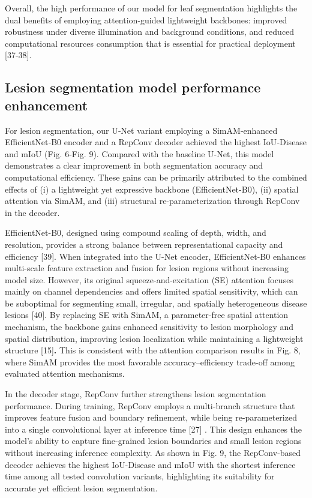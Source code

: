 \documentclass[
]{article}
\begin{document}
Overall, the high performance of our model for leaf segmentation
highlights the dual benefits of employing attention-guided lightweight
backbones: improved robustness under diverse illumination and background
conditions, and reduced computational resources consumption that is
essential for practical deployment {[}37-38{]}.

\hypertarget{lesion-segmentation-model-performance-enhancement}{%
\subsection{Lesion segmentation model performance
enhancement}\label{lesion-segmentation-model-performance-enhancement}}

For lesion segmentation, our U‑Net variant employing a SimAM‑enhanced
EfficientNet‑B0 encoder and a RepConv decoder achieved the highest
IoU‑Disease and mIoU (Fig. 6-Fig. 9). Compared with the baseline U-Net,
this model demonstrates a clear improvement in both segmentation
accuracy and computational efficiency. These gains can be primarily
attributed to the combined effects of (i) a lightweight yet expressive
backbone (EfficientNet-B0), (ii) spatial attention via SimAM, and (iii)
structural re-parameterization through RepConv in the decoder.

EfficientNet-B0, designed using compound scaling of depth, width, and
resolution, provides a strong balance between representational capacity
and efficiency {[}39{]}. When integrated into the U-Net encoder,
EfficientNet-B0 enhances multi-scale feature extraction and fusion for
lesion regions without increasing model size. However, its original
squeeze-and-excitation (SE) attention focuses mainly on channel
dependencies and offers limited spatial sensitivity, which can be
suboptimal for segmenting small, irregular, and spatially heterogeneous
disease lesions {[}40{]}. By replacing SE with SimAM, a parameter-free
spatial attention mechanism, the backbone gains enhanced sensitivity to
lesion morphology and spatial distribution, improving lesion
localization while maintaining a lightweight structure
{[}15{]}\textbf{.} This is consistent with the attention comparison
results in Fig. 8, where SimAM provides the most favorable
accuracy--efficiency trade-off among evaluated attention mechanisms.

In the decoder stage, RepConv further strengthens lesion segmentation
performance. During training, RepConv employs a multi-branch structure
that improves feature fusion and boundary refinement, while being
re-parameterized into a single convolutional layer at inference time
{[}27{]} . This design enhances the model's ability to capture
fine-grained lesion boundaries and small lesion regions without
increasing inference complexity. As shown in Fig. 9, the RepConv-based
decoder achieves the highest IoU-Disease and mIoU with the shortest
inference time among all tested convolution variants, highlighting its
suitability for accurate yet efficient lesion segmentation.
\end{document}
